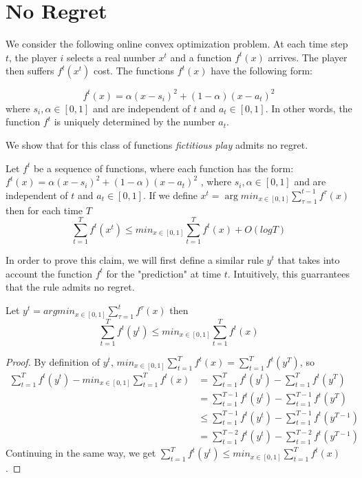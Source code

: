 \section{No Regret}
We consider the following online convex optimization problem.
At each time step $t$, the player $i$ selects a real number $x^t$ and a
function $f^t(x)$ arrives. The player then suffers $f^t(x^t)$ cost.
The functions $f^t(x)$ have the following form:

$$f^t(x) = \alpha(x-s_i)^2 + (1-\alpha)(x-a_t)^2$$
where $s_i,\alpha \in [0,1]$ and are independent of $t$ and $a_t \in [0,1]$.
In other words, the function $f^t$ is uniquely determined by the number $a_t$.

We show that for this class of functions \emph{fictitious play} admits no regret.
\begin{theorem}\label{t:no_regret}
  Let $f^t$ be a sequence of functions, where each function has the form: $f^t(x) = \alpha(x-s_i)^2 + (1-\alpha)(x-a_t)^2$ , where $s_i,\alpha \in [0,1]$ and are independent of $t$ and $a_t \in [0,1]$. If we define $x^t = \arg min_{x \in [0,1]} \sum_{\tau = 1}^{t-1} f^\tau (x)$ then for each time $T$
  $$
  \sum_{t = 1}^{T} f^t(x^t) \leq min_{x \in [0,1]} \sum_{t=1}^T f^t(x) + O(log T)
  $$
\end{theorem}

In order to prove this claim, we will first define a similar rule $y^t$ that takes into account the function $f^t$ 
for the "prediction" at time $t$. Intuitively, this guarrantees that the rule admits no regret. 


\begin{lemma} Let $y^t = argmin_{x \in [0,1]} \sum_{\tau = 1}^t f^\tau (x)$ then
  $$ \sum_{t=1}^T f^t(y^t) \leq min_{x \in [0,1]} \sum_{t=1}^T f^t(x)$$
\end{lemma}
\begin{proof}By definition of $y^t$,
  $min_{x \in [0,1]} \sum_{t=1}^T f^t(x) = \sum_{t=1}^T f^t(y^T)$, so
  \begin{align*}
    \sum_{t=1}^T f^t(y^t) - min_{x \in [0,1]} \sum_{t=1}^T f^t(x) &=
    \sum_{t=1}^T f^t(y^t) - \sum_{t=1}^T f^t(y^T)\\
    &= \sum_{t=1}^{T-1} f^t(y^t) - \sum_{t=1}^{T-1} f^t(y^T)\\
    &\leq \sum_{t=1}^{T-1} f^t(y^t) - \sum_{t=1}^{T-1} f^t(y^{T-1})\\
    &= \sum_{t=1}^{T-2} f^t(y^t) - \sum_{t=1}^{T-2} f^t(y^{T-1})
  \end{align*}
  Continuing in the same way, we get
  $\sum_{t=1}^T f^t(y^t) \leq min_{x \in [0,1]} \sum_{t=1}^T f^t(x)$.
\end{proof}

